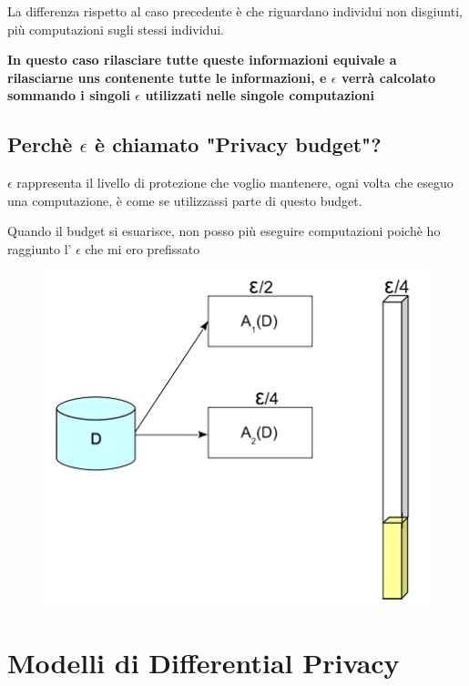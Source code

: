 \documentclass{report}
\begin{document}
\noindent La differenza rispetto al caso precedente è che riguardano individui non disgiunti, più computazioni sugli stessi individui.

\noindent \textbf{In questo caso rilasciare tutte queste informazioni equivale a rilasciarne uns contenente tutte le informazioni, e $\epsilon$ verrà calcolato sommando i singoli $\epsilon$
utilizzati nelle singole computazioni}

\section{Perchè $\epsilon$ è chiamato "Privacy budget"?}
$\epsilon$ rappresenta il livello di protezione che voglio mantenere, ogni volta che eseguo una computazione, è come se utilizzassi parte di questo budget.

\noindent Quando il budget si esuarisce, non posso più eseguire computazioni poichè ho raggiunto l' $\epsilon$ che mi ero prefissato
\begin{figure}[H]
        \centering
        \includegraphics[width=0.4\linewidth]{images/privacyBudget.png}
\end{figure}

\chapter{Modelli di Differential Privacy}
\end{document}

